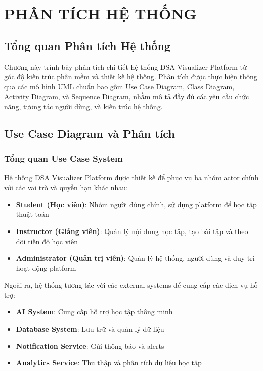 \chapter{PHÂN TÍCH HỆ THỐNG}
\label{ch:system-analysis}

\section{Tổng quan Phân tích Hệ thống}
\label{sec:system-analysis-overview}

Chương này trình bày phân tích chi tiết hệ thống DSA Visualizer Platform từ góc độ kiến trúc phần mềm và thiết kế hệ thống. Phân tích được thực hiện thông qua các mô hình UML chuẩn bao gồm Use Case Diagram, Class Diagram, Activity Diagram, và Sequence Diagram, nhằm mô tả đầy đủ các yêu cầu chức năng, tương tác người dùng, và kiến trúc hệ thống.

\section{Use Case Diagram và Phân tích}
\label{sec:use-case-diagram}

\subsection{Tổng quan Use Case System}
\label{subsec:use-case-system-overview}

Hệ thống DSA Visualizer Platform được thiết kế để phục vụ ba nhóm actor chính với các vai trò và quyền hạn khác nhau:

\begin{itemize}
    \item \textbf{Student (Học viên)}: Nhóm người dùng chính, sử dụng platform để học tập thuật toán
    \item \textbf{Instructor (Giảng viên)}: Quản lý nội dung học tập, tạo bài tập và theo dõi tiến độ học viên
    \item \textbf{Administrator (Quản trị viên)}: Quản lý hệ thống, người dùng và duy trì hoạt động platform
\end{itemize}

Ngoài ra, hệ thống tương tác với các external systems để cung cấp các dịch vụ hỗ trợ:

\begin{itemize}
    \item \textbf{AI System}: Cung cấp hỗ trợ học tập thông minh
    \item \textbf{Database System}: Lưu trữ và quản lý dữ liệu
    \item \textbf{Notification Service}: Gửi thông báo và alerts
    \item \textbf{Analytics Service}: Thu thập và phân tích dữ liệu học tập
\end{itemize}

